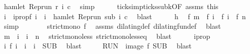 \begin{isabellebody}
\ {\isacartoucheopen}hamlet\ {\isacharparenleft}{\isacharparenleft}Rep{\isacharunderscore}run\ r{\isacharparenright}\ i\ c{\isacharparenright}{\isacartoucheclose}\ \isamarkupfalse%
\ simp\isanewline
\ \ \ \ \isamarkupfalse%
\ ticks{\isacharunderscore}imp{\isacharunderscore}ticks{\isacharunderscore}subk{\isacharbrackleft}OF\ assms\ this{\isacharbrackright}\isanewline
\ \ \ \ \ \ \isamarkupfalse%
\ i\ \ i{}prop{\isacharcolon}{\isacartoucheopen}f\ i\ {\isacharequal}\ i\ {\isasymand}\ hamlet\ {\isacharparenleft}{\isacharparenleft}Rep{\isacharunderscore}run\ sub{\isacharparenright}\ i\ c{\isacharparenright}{\isacartoucheclose}\ \isamarkupfalse%
\ blast\isanewline
\ \ \ \ \isamarkupfalse%
\ h\ \isamarkupfalse%
\ {\isacartoucheopen}f\ m\ {\isasymle}\ f\ i\ {\isasymand}\ f\ i\ {\isacharless}\ f\ n{\isacartoucheclose}\ \isamarkupfalse%
\ simp\isanewline
\ \ \ \ \isamarkupfalse%
\ \isamarkupfalse%
\ {\isacartoucheopen}strict{\isacharunderscore}mono\ f{\isacartoucheclose}\ \isamarkupfalse%
\ assms\ dilating{\isacharunderscore}def\ dilating{\isacharunderscore}fun{\isacharunderscore}def\ \isamarkupfalse%
\ blast\isanewline
\ \ \ \ \isamarkupfalse%
\ \isamarkupfalse%
\ {\isacartoucheopen}m\ {\isasymle}\ i\ {\isasymand}\ i\ {\isacharless}\ n{\isacartoucheclose}\ \isamarkupfalse%
\ strict{\isacharunderscore}mono{\isacharunderscore}less\ strict{\isacharunderscore}mono{\isacharunderscore}less{\isacharunderscore}eq\ \isamarkupfalse%
\ blast\isanewline
\ \ \ \ \isamarkupfalse%
\ i{}prop\ \isamarkupfalse%
\ {\isacartoucheopen}{\isasymexists}i\ f\ i\ {\isacharequal}\ i\ {\isasymand}\ i\ {\isasymin}\ {\isacharquery}SUB{\isacartoucheclose}\ \isamarkupfalse%
\ blast\isanewline
\ \ \isacommand{{\isacharbraceright}}\isamarkupfalse%
\ \isamarkupfalse%
\ {\isacartoucheopen}{\isacharquery}RUN\ {\isasymsubseteq}\ image\ f\ {\isacharquery}SUB{\isacartoucheclose}\ \isamarkupfalse%
\ blast\isanewline
{}\isamarkupfalse%
%
\endisatagproof

\end{isabellebody}
